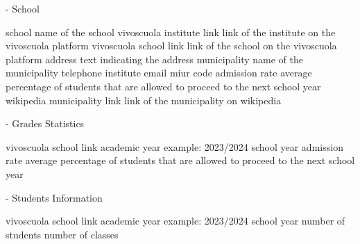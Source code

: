 - School

school name of the school
vivoscuola institute link link of the institute on the vivoscuola platform
vivoscuola school link link of the school on the vivoscuola platform
address text indicating the address
municipality name of the municipality
telephone
institute email
miur code
admission rate average percentage of students that are allowed to proceed to the next school year
wikipedia municipality link link of the municipality on wikipedia

- Grades Statistics

vivoscuola school link
academic year example: 2023/2024
school year 
admission rate average percentage of students that are allowed to proceed to the next school year

- Students Information

vivoscuola school link
academic year example: 2023/2024
school year
number of students
number of classes


